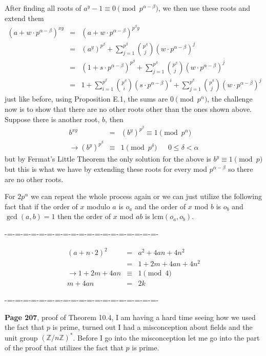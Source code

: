 \documentclass[aps,preprint,preprintnumbers,nofootinbib,showpacs,prd]{revtex4-1}
\newcommand{\nbea}{\begin{eqnarray*}}
\newcommand{\neea}{\end{eqnarray*}}
\begin{document}
After finding all roots of $a^y - 1 \equiv 0 \pmod{p^{\alpha-\beta}}$, we then use these roots and extend them
%
\nbea
(a + w\cdot p^{\alpha-\beta})^{xy} & = & (a + w\cdot p^{\alpha-\beta})^{p^\beta y} \\
& = & (a^y)^{p^\beta} + \sum_{j=1}^{p^\beta} \binom{p^\beta}{j} (w\cdot p^{\alpha-\beta})^j \\
& = & (1 + s\cdot p^{\alpha-\beta})^{p^\beta} + \sum_{j=1}^{p^\beta} \binom{p^\beta}{j} (w\cdot p^{\alpha-\beta})^j \\
& = & 1 + \sum_{i=1}^{p^\beta} \binom{p^\beta}{i} (s\cdot p^{\alpha-\beta})^i + \sum_{j=1}^{p^\beta} \binom{p^\beta}{j} (w\cdot p^{\alpha-\beta})^j
\neea
%
just like before, using Proposition E.1, the sums are $0 \pmod{p^\alpha}$, the challenge now is to show that there are no other roots other than the ones shown above. Suppose there is another root, $b$, then
%
\nbea
b^{xy} & = & (b^{y})^{p^\beta} \equiv 1 \pmod{p^\alpha} \\
\to (b^{y})^{p^\beta} & \equiv & 1 \pmod{p^\delta} ~~~~~~~ 0 \le \delta < \alpha
\neea
%
but by Fermat's Little Theorem the only solution for the above is $b^y \equiv 1 \pmod{p}$ but this is what we have by extending these roots for every mod $p^{\alpha-\beta}$ so there are no other roots.

For $2p^\alpha$ we can repeat the whole process again or we can just utilize the following fact that if the order of $x$ modulo $a$ is $o_a$ and the order of $x$ mod $b$ is $o_b$ and $\gcd(a,b) = 1$ then the order of $x$ mod $ab$ is lcm$(o_a,o_b)$.




-=-=-=-=-=-=-=-=-=-=-=-=-=-=-=-=-=-=-=-


%
\nbea
(a + n\cdot2)^2 & = & a^2 + 4an + 4n^2 \\
& = & 1 + 2m + 4an + 4n^2 \\
\to 1 + 2m +4an & \equiv & 1 \pmod{4} \\
m + 4an & = & 2k
\neea
%


-=-=-=-=-=-=-=-=-=-=-=-=-=-=-=-=-=-=-=-









{\bf Page 207}, proof of Theorem 10.4, I am having a hard time seeing how we used the fact that $p$ is prime, turned out I had a misconception about fields and the unit group $(\mathbb{Z}/n\mathbb{Z})^*$. Before I go into the misconception let me go into the part of the proof that utilizes the fact that $p$ is prime.
\end{document}
